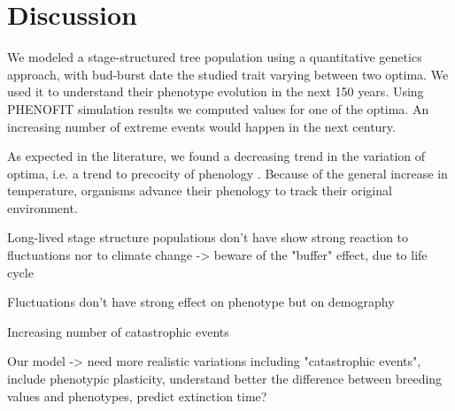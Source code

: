 \label{sec:Disc}
\section*{Discussion}

We modeled a stage-structured tree population using a quantitative genetics approach, with bud-burst date the studied trait varying between two optima. We used it to understand their phenotype evolution in the next 150 years. Using \textsc{PHENOFIT} simulation results we computed values for one of the optima. An increasing number of extreme events would happen in the next century.

As expected in the literature, we found a decreasing trend in the variation of optima, i.e. a trend to precocity of phenology \citep{aitken_adaptation_2008, ehrlen_timing_2009}. Because of the general increase in temperature, organisms advance their phenology to track their original environment.

Long-lived stage structure populations don't have show strong reaction to fluctuations nor to climate change -> beware of the "buffer" effect, due to life cycle

Fluctuations don't have strong effect on phenotype but on demography 

Increasing number of catastrophic events

Our model -> need more realistic variations including "catastrophic events", include phenotypic plasticity, understand better the difference between breeding values and phenotypes, predict extinction time?